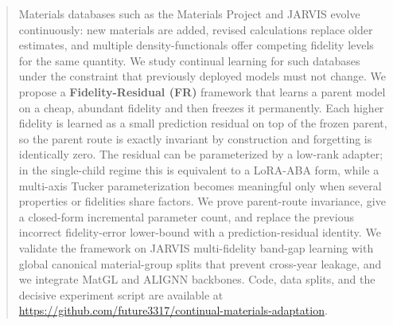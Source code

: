 \documentclass{article}
\theoremstyle{plain}
\theoremstyle{definition}
\theoremstyle{remark}
\begin{document}

\printAffiliationsAndNotice{\icmlEqualContribution}

\begin{abstract}
Materials databases such as the Materials Project and JARVIS evolve continuously: new materials are added, revised calculations replace older estimates, and multiple density-functionals offer competing fidelity levels for the same quantity. We study continual learning for such databases under the constraint that previously deployed models must not change. We propose a \textbf{Fidelity-Residual (FR)} framework that learns a parent model on a cheap, abundant fidelity and then freezes it permanently. Each higher fidelity is learned as a small prediction residual on top of the frozen parent, so the parent route is exactly invariant by construction and forgetting is identically zero. The residual can be parameterized by a low-rank adapter; in the single-child regime this is equivalent to a LoRA-ABA form, while a multi-axis Tucker parameterization becomes meaningful only when several properties or fidelities share factors. We prove parent-route invariance, give a closed-form incremental parameter count, and replace the previous incorrect fidelity-error lower-bound with a prediction-residual identity. We validate the framework on JARVIS multi-fidelity band-gap learning with global canonical material-group splits that prevent cross-year leakage, and we integrate MatGL and ALIGNN backbones. Code, data splits, and the decisive experiment script are available at \url{https://github.com/future3317/continual-materials-adaptation}.
\end{abstract}
\end{document}
